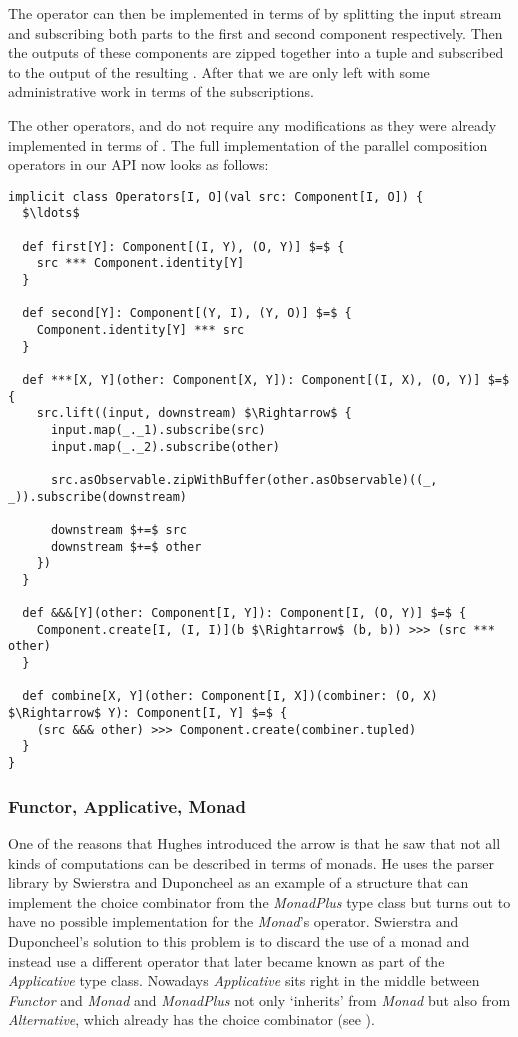 The \code{(***)} operator can then be implemented in terms of  by splitting the input stream and subscribing both parts to the first and second component respectively. Then the outputs of these components are zipped together into a tuple and subscribed to the output of the resulting \comp. After that we are only left with some administrative work in terms of the subscriptions.

The other operators, \code{(\&\&\&)} and  do not require any modifications as they were already implemented in terms of \code{(***)}. The full implementation of the parallel composition operators in our API now looks as follows:

\begin{minipage}{\linewidth}
\begin{lstlisting}[style=ScalaStyle]
implicit class Operators[I, O](val src: Component[I, O]) {
  $\ldots$

  def first[Y]: Component[(I, Y), (O, Y)] $=$ {
    src *** Component.identity[Y]
  }

  def second[Y]: Component[(Y, I), (Y, O)] $=$ {
    Component.identity[Y] *** src
  }

  def ***[X, Y](other: Component[X, Y]): Component[(I, X), (O, Y)] $=$ {
    src.lift((input, downstream) $\Rightarrow$ {
      input.map(_._1).subscribe(src)
      input.map(_._2).subscribe(other)

      src.asObservable.zipWithBuffer(other.asObservable)((_, _)).subscribe(downstream)

      downstream $+=$ src
      downstream $+=$ other
    })
  }

  def &&&[Y](other: Component[I, Y]): Component[I, (O, Y)] $=$ {
    Component.create[I, (I, I)](b $\Rightarrow$ (b, b)) >>> (src *** other)
  }

  def combine[X, Y](other: Component[I, X])(combiner: (O, X) $\Rightarrow$ Y): Component[I, Y] $=$ {
    (src &&& other) >>> Component.create(combiner.tupled)
  }
}
\end{lstlisting}
\end{minipage}

\subsubsection{Functor, Applicative, Monad}
One of the reasons that Hughes introduced the arrow  is that he saw that not all kinds of computations can be described in terms of monads. He uses the parser library by Swierstra and Duponcheel  as an example of a structure that can implement the choice combinator from the \textit{MonadPlus} type class but turns out to have no possible implementation for the \textit{Monad}'s \code{(>>=)} operator. Swierstra and Duponcheel's solution to this problem is to discard the use of a monad and instead use a different operator \code{(<*>)} that later became known as part of the \textit{Applicative} type class. Nowadays \textit{Applicative} sits right in the middle between \textit{Functor} and \textit{Monad} and \textit{MonadPlus} not only `inherits' from \textit{Monad} but also from \textit{Alternative}, which already has the choice combinator (see ).

